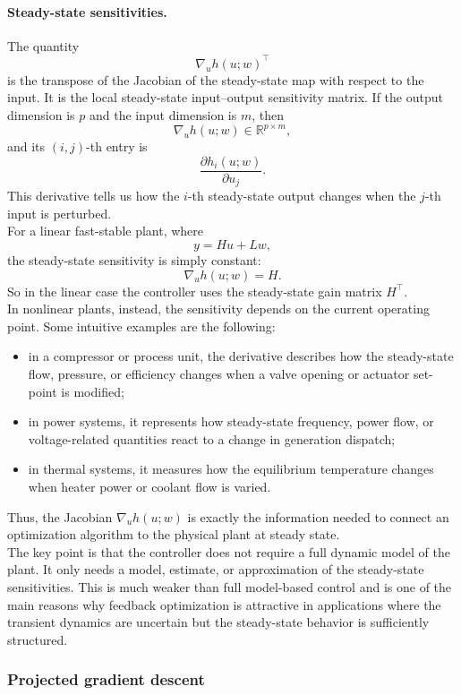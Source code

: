\paragraph{Steady-state sensitivities.}
The quantity
\[
\nabla_u h(u;w)^\top
\]
is the transpose of the Jacobian of the steady-state map with respect to the input. It is the local steady-state input--output sensitivity matrix. If the output dimension is $p$ and the input dimension is $m$, then
\[
\nabla_u h(u;w)\in\mathbb R^{p\times m},
\]
and its $(i,j)$-th entry is
\[
\frac{\partial h_i(u;w)}{\partial u_j}.
\]
This derivative tells us how the $i$-th steady-state output changes when the $j$-th input is perturbed.\\
For a linear fast-stable plant, where
\[
y=Hu+Lw,
\]
the steady-state sensitivity is simply constant:
\[
\nabla_u h(u;w)=H.
\]
So in the linear case the controller uses the steady-state gain matrix $H^\top$.\\

In nonlinear plants, instead, the sensitivity depends on the current operating point. Some intuitive examples are the following:
\begin{itemize}
    \item in a compressor or process unit, the derivative describes how the steady-state flow, pressure, or efficiency changes when a valve opening or actuator set-point is modified;
    \item in power systems, it represents how steady-state frequency, power flow, or voltage-related quantities react to a change in generation dispatch;
    \item in thermal systems, it measures how the equilibrium temperature changes when heater power or coolant flow is varied.
\end{itemize}
Thus, the Jacobian $\nabla_u h(u;w)$ is exactly the information needed to connect an optimization algorithm to the physical plant at steady state.\\

The key point is that the controller does not require a full dynamic model of the plant. It only needs a model, estimate, or approximation of the steady-state sensitivities. This is much weaker than full model-based control and is one of the main reasons why feedback optimization is attractive in applications where the transient dynamics are uncertain but the steady-state behavior is sufficiently structured.

\subsubsection{Projected gradient descent}

